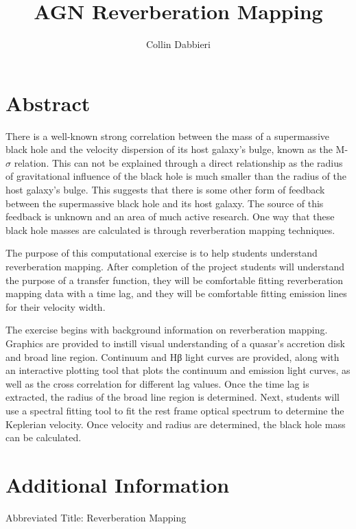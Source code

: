 \documentclass[]{article}
\title{AGN Reverberation Mapping}
\author{Collin Dabbieri}
\date{}
\begin{document}
\maketitle

{
\setcounter{tocdepth}{2}
\tableofcontents
}
\hypertarget{abstract}{%
\section{Abstract}\label{abstract}}

There is a well-known strong correlation between the mass of a
supermassive black hole and the velocity dispersion of its host galaxy's
bulge, known as the M-\(\sigma\) relation. This can not be explained
through a direct relationship as the radius of gravitational influence
of the black hole is much smaller than the radius of the host galaxy's
bulge. This suggests that there is some other form of feedback between
the supermassive black hole and its host galaxy. The source of this
feedback is unknown and an area of much active research. One way that
these black hole masses are calculated is through reverberation mapping
techniques.

The purpose of this computational exercise is to help students
understand reverberation mapping. After completion of the project
students will understand the purpose of a transfer function, they will
be comfortable fitting reverberation mapping data with a time lag, and
they will be comfortable fitting emission lines for their velocity
width.

The exercise begins with background information on reverberation
mapping. Graphics are provided to instill visual understanding of a
quasar's accretion disk and broad line region. Continuum and Hβ light
curves are provided, along with an interactive plotting tool that plots
the continuum and emission light curves, as well as the cross
correlation for different lag values. Once the time lag is extracted,
the radius of the broad line region is determined. Next, students will
use a spectral fitting tool to fit the rest frame optical spectrum to
determine the Keplerian velocity. Once velocity and radius are
determined, the black hole mass can be calculated.

\hypertarget{additional-information}{%
\section{Additional Information}\label{additional-information}}

Abbreviated Title: Reverberation Mapping
\end{document}

